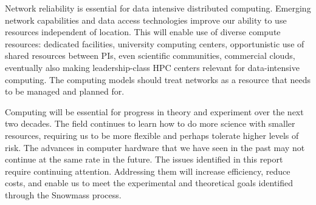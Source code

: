 Network reliability is essential for data intensive distributed computing.
Emerging network capabilities and data access technologies improve our
ability to use resources independent of location. This will enable use of
diverse compute resources: dedicated facilities, university computing
centers, opportunistic use of shared resources between PIs, even scientific
communities, commercial clouds, eventually also making leadership-class HPC
centers relevant for data-intensive computing. The computing models should
treat networks as a resource that needs to be managed and planned for.

Computing will be essential for progress in theory and experiment over the
next two decades. The field continues to learn how to do more science with
smaller resources, requiring us to be more flexible and perhaps tolerate
higher levels of risk. The advances in computer hardware that we have seen
in the past may not continue at the same rate in the future. The issues
identified in this report require continuing attention. Addressing them
will increase efficiency, reduce costs, and enable us to meet the
experimental and theoretical goals identified through the Snowmass process.
